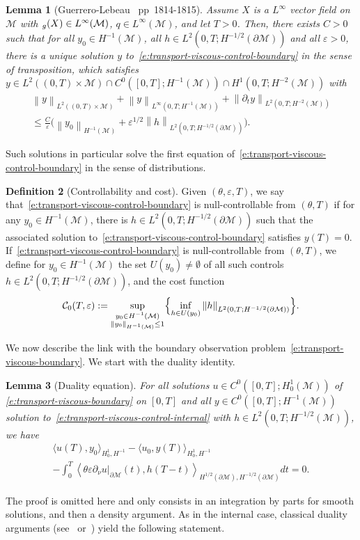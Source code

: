 \documentclass[11pt]{article}
\numberwithin{equation}{section}
\newtheorem{lemma}{Lemma}[section]
\theoremstyle{definition}
\newtheorem{definition}[lemma]{Definition}
\newcommand{\M}{\ensuremath{\mathcal M}}
\let \div \relax
\DeclareMathOperator{\div}{div}
\newcommand\nor[2]{\left\|#1\right\|_{#2}}
\let\d\partial
\let\eps\varepsilon
\begin{document}
\begin{lemma}[Guerrero-Lebeau~\cite{GL:07} pp~1814-1815]
Assume $X$ is a $L^\infty$ vector field on $\M$ with $\div_{g}(X) \in L^\infty(\M)$, $q \in L^\infty(\M)$, and let $T>0$. Then, there exists $C>0$ such that for all $y_0 \in H^{-1}(\M)$, all $h \in L^2(0,T ; H^{-1/2}(\d\M))$ and all $\eps>0$, there is a unique solution $y$ to~\eqref{e:transport-viscous-control-boundary} in the sense of transposition, which satisfies $y \in L^2((0,T)\times \M) \cap C^0([0,T]; H^{-1}(\M)) \cap H^1(0,T ; H^{-2}(\M))$ with
\begin{multline*}
\nor{y}{L^2((0,T)\times \M)} + \nor{y}{L^\infty(0,T; H^{-1}(\M))} + \nor{\d_t y}{L^2(0,T ; H^{-2}(\M))} \\
\leq \frac{C}{\eps} \bigl( \nor{y_0}{H^{-1}(\M)}+ \eps^{1/2} \nor{h}{L^2(0,T ; H^{-1/2}(\d\M))}\bigr).
\end{multline*}
\end{lemma}
Such solutions in particular solve the first equation of~\eqref{e:transport-viscous-control-boundary} in the sense of distributions.
\begin{definition}[Controllability and cost]
Given $(\theta, \eps, T)$, we say that~\eqref{e:transport-viscous-control-boundary} is null-controllable from $(\theta, T)$ if for any $y_0 \in H^{-1}(\M)$, there is $h \in L^2(0,T; H^{-1/2}(\d\M))$ such that the associated solution to~\eqref{e:transport-viscous-control-boundary} satisfies $y(T) =0$.
If~\eqref{e:transport-viscous-control-boundary} is null-controllable from $(\theta, T)$, we define for $y_0 \in H^{-1}(\M)$ the set $U(y_0) \neq \emptyset$ of all such controls $h \in L^2(0,T; H^{-1/2}(\d\M))$, and the cost function
\[
\mathcal{C}_0(T,\eps) := \sup_{\substack{y_0 \in H^{-1}(\M)\\ \nor{y_0}{H^{-1}(\M)}\leq 1}} \Bigl\{\inf_{h \in U(y_0)} \nor{h}{L^2(0,T; H^{-1/2}(\d\M))} \Bigr\}.
\]
\end{definition}

We now describe the link with the boundary observation problem~\eqref{e:transport-viscous-boundary}.
We start with the duality identity.
\begin{lemma}[Duality equation]
For all solutions $u \in C^0([0,T]; H^1_0(\M))$ of \eqref{e:transport-viscous-boundary} on $[0,T]$ and all $y\in C^0([0,T]; H^{-1}(\M))$ solution to~\eqref{e:transport-viscous-control-internal} with $h \in L^2(0,T; H^{-1/2}(\M))$, we have
\begin{multline*}
\langle u(T), y_0\rangle_{H^1_0, H^{-1}} - \langle u_0, y(T)\rangle_{H^1_0, H^{-1}} \\
- \int_0^T \left\langle \theta \eps \d_{\nu}u|_{\d\M}(t), h(T-t) \right\rangle_{H^{1/2}(\d\M),H^{-1/2}(\d\M)} dt =0.
\end{multline*}
\end{lemma}
The proof is omitted here and only consists in an integration by parts for smooth solutions, and then a density argument.
As in the internal case, classical duality arguments (see~\cite{DR:77} or~\cite[Chap.\,2.3]{Cor:book}) yield the following statement.
\end{document}
